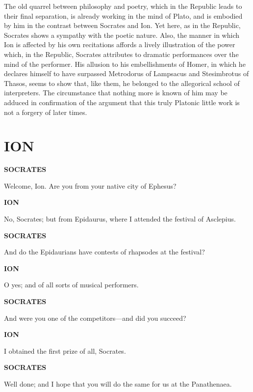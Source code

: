 \documentclass[11pt,letter]{article}
\begin{document}
\par  The old quarrel between philosophy and poetry, which in the Republic leads to their final separation, is already working in the mind of Plato, and is embodied by him in the contrast between Socrates and Ion. Yet here, as in the Republic, Socrates shows a sympathy with the poetic nature. Also, the manner in which Ion is affected by his own recitations affords a lively illustration of the power which, in the Republic, Socrates attributes to dramatic performances over the mind of the performer. His allusion to his embellishments of Homer, in which he declares himself to have surpassed Metrodorus of Lampsacus and Stesimbrotus of Thasos, seems to show that, like them, he belonged to the allegorical school of interpreters. The circumstance that nothing more is known of him may be adduced in confirmation of the argument that this truly Platonic little work is not a forgery of later times.

\par 
\section{
      ION
    } 
\par \textbf{SOCRATES}
\par   Welcome, Ion. Are you from your native city of Ephesus?

\par \textbf{ION}
\par   No, Socrates; but from Epidaurus, where I attended the festival of Asclepius.

\par \textbf{SOCRATES}
\par   And do the Epidaurians have contests of rhapsodes at the festival?

\par \textbf{ION}
\par   O yes; and of all sorts of musical performers.

\par \textbf{SOCRATES}
\par   And were you one of the competitors—and did you succeed?

\par \textbf{ION}
\par   I obtained the first prize of all, Socrates.

\par \textbf{SOCRATES}
\par   Well done; and I hope that you will do the same for us at the Panathenaea.
\end{document}
